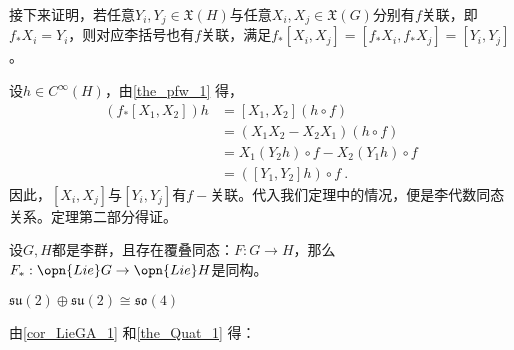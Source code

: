 接下来证明，若任意$Y_i,Y_j\in \mathfrak{X}(H)$与任意$X_i,X_j\in \mathfrak{X}(G)$分别有$f$关联，即$f_*X_i=Y_i$，则对应李括号也有$f$关联，满足$f_*[X_i,X_j]=[f_*X_i,f_*X_j]=[Y_i,Y_j]$。

设$h\in C^{\infty} (H)$，由\autoref{the_pfw_1} 得，
\begin{equation}
\begin{aligned}
(f_*[X_1,X_2])h&=[X_1,X_2](h\circ f)\\
&=(X_1X_2-X_2X_1)(h\circ f)\\
&=X_1(Y_2h)\circ f-X_2(Y_1h)\circ f\\
&=([Y_1,Y_2]h)\circ f~.
\end{aligned}
\end{equation}
因此，$[X_i,X_j]$与$[Y_i,Y_j]$有$f-$关联。代入我们定理中的情况，便是李代数同态关系。定理第二部分得证。
\begin{corollary}{}\label{cor_LieGA_1}
设$G,H$都是李群，且存在覆叠同态：$F:G\to H$，那么$F_*:\opn{Lie}G\to \opn{Lie}H$是同构。
\end{corollary}
\begin{example}{}
$\mathfrak {su}(2)\oplus \mathfrak {su}(2)\cong \mathfrak{so}(4)$
\end{example}
由\autoref{cor_LieGA_1} 和\autoref{the_Quat_1} 得：


















